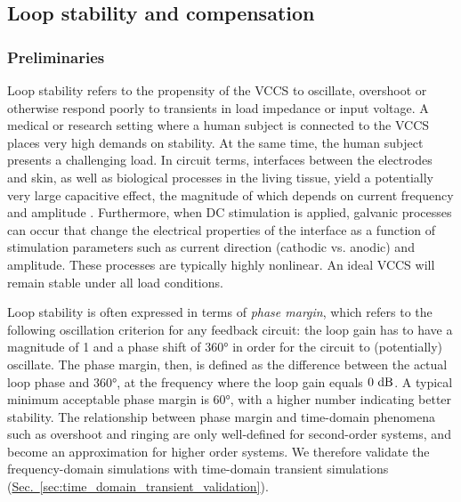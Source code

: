 \documentclass[10pt]{article}
\newcommand{\briefseclink}[1]{\hyperref[#1]{Sec.~\ref*{#1}}}
\begin{document}
\subsection{Loop stability and compensation}
\label{sec:loop_stability_compensation}

\subsubsection{Preliminaries}

Loop stability refers to the propensity of the VCCS to oscillate, overshoot or  otherwise respond poorly to transients in load impedance or input voltage. A medical or research setting where a human subject is connected to the VCCS places very high demands on stability. At the same time, the human subject presents a challenging load. In circuit terms, interfaces between the electrodes and skin, as well as biological processes in the living tissue, yield a potentially very large capacitive effect, the magnitude of which depends on current frequency and amplitude \cite{lyklema_fundamentals}\cite{Grant2010}\cite{bioimpedance_bioelectricity}. Furthermore, when DC stimulation is applied, galvanic processes can occur \cite{lyklema_fundamentals} that change the electrical properties of the interface as a function of stimulation parameters such as current direction (cathodic vs. anodic) and amplitude. These processes are typically highly nonlinear. An ideal VCCS will remain stable under all load conditions.

Loop stability is often expressed in terms of \emph{phase margin}, which refers to the following oscillation criterion for any feedback circuit: the loop gain has to have a magnitude of 1 and a phase shift of $\ang{360}$ in order for the circuit to (potentially) oscillate. The phase margin, then, is defined as the difference between the actual loop phase and $\ang{360}$, at the frequency where the loop gain equals $0~\decibel$. A typical minimum acceptable phase margin is $\ang{60}$, with a higher number indicating better stability. The relationship between phase margin and time-domain phenomena such as overshoot and ringing are only well-defined for second-order systems, and become an approximation for higher order systems. We therefore validate the frequency-domain simulations with time-domain transient simulations (\briefseclink{sec:time_domain_transient_validation}).
\end{document}
